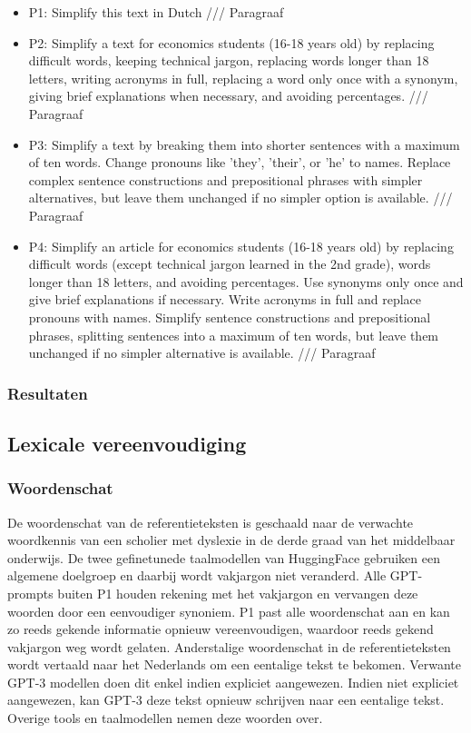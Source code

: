 \begin{itemize}
	\item P1: Simplify this text in Dutch /// Paragraaf
	\item P2: Simplify a text for economics students (16-18 years old) by replacing difficult words, keeping technical jargon, replacing words longer than 18 letters, writing acronyms in full, replacing a word only once with a synonym, giving brief explanations when necessary, and avoiding percentages. /// Paragraaf
	\item P3: Simplify a text by breaking them into shorter sentences with a maximum of ten words. Change pronouns like 'they', 'their', or 'he' to names. Replace complex sentence constructions and prepositional phrases with simpler alternatives, but leave them unchanged if no simpler option is available. /// Paragraaf
	\item P4: Simplify an article for economics students (16-18 years old) by replacing difficult words (except technical jargon learned in the 2nd grade), words longer than 18 letters, and avoiding percentages. Use synonyms only once and give brief explanations if necessary. Write acronyms in full and replace pronouns with names. Simplify sentence constructions and prepositional phrases, splitting sentences into a maximum of ten words, but leave them unchanged if no simpler alternative is available. /// Paragraaf
\end{itemize}

\subsubsection{Resultaten}

\subsection{Lexicale vereenvoudiging}

\subsubsection{Woordenschat}
De woordenschat van de referentieteksten is geschaald naar de verwachte woordkennis van een scholier met dyslexie in de derde graad van het middelbaar onderwijs. De twee gefinetunede taalmodellen van HuggingFace gebruiken een algemene doelgroep en daarbij wordt vakjargon niet veranderd. Alle GPT-prompts buiten P1 houden rekening met het vakjargon en vervangen deze woorden door een eenvoudiger synoniem. P1 past alle woordenschat aan en kan zo reeds gekende informatie opnieuw vereenvoudigen, waardoor reeds gekend vakjargon weg wordt gelaten. Anderstalige woordenschat in de referentieteksten wordt vertaald naar het Nederlands om een eentalige tekst te bekomen. Verwante GPT-3 modellen doen dit enkel indien expliciet aangewezen. Indien niet expliciet aangewezen, kan GPT-3 deze tekst opnieuw schrijven naar een eentalige tekst. Overige tools en taalmodellen nemen deze woorden over. 

